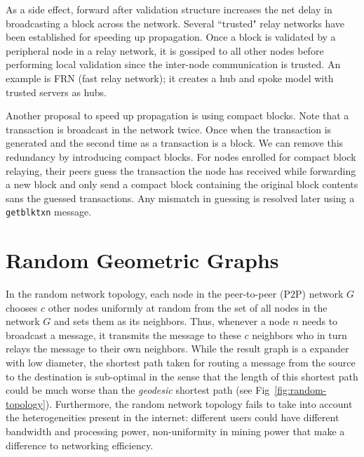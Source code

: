 \documentclass{article}
\begin{document}
As a side effect, forward after validation structure increases the net delay in broadcasting a block across the network. Several ``trusted" relay networks have been established for speeding up propagation. Once a block is validated by a peripheral node in a relay network, it is gossiped to all other nodes before performing local validation since the inter-node communication is trusted. An example is FRN (fast relay network); it creates a hub and spoke model with trusted servers as hubs. 

Another proposal to speed up propagation is using compact blocks. Note that a transaction is broadcast in the network twice. Once when the transaction is generated and the second time as a transaction is a block. We can remove this redundancy by introducing compact blocks. For nodes enrolled for compact block relaying, their peers guess the transaction the node has received while forwarding a new block and only send a compact block containing the original block contents sans the guessed transactions. Any mismatch in guessing is resolved later using a {\tt getblktxn} message. 

\section*{Random Geometric Graphs}
In the random network topology, each node in the peer-to-peer (P$2$P) network $G$ chooses $c$ other nodes uniformly at random from the set of all nodes in the network $G$ and sets them as its neighbors. Thus, whenever a node $n$ needs to broadcast a message, it transmits the message to these $c$ neighbors who in turn relays the message to their own neighbors. While the result graph is a expander with low diameter, the shortest path taken for routing a message from the source to the destination is sub-optimal in the sense that the length of this shortest path could be much worse than the {\em geodesic} shortest path (see Fig~\ref{fig:random-topology}). Furthermore, the random network topology fails to take into account the heterogeneities present in the internet: different users could have different bandwidth and processing power, non-uniformity in mining power that make a difference to networking efficiency. 
\end{document}
